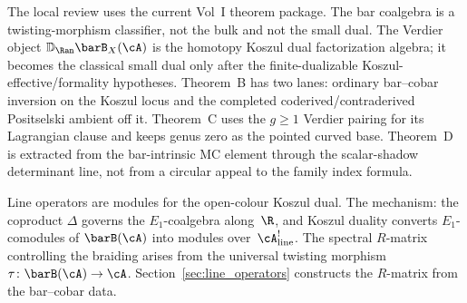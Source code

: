 \begin{remark}
\label{rem:vol1-theorem-package-rectification}
The local review uses the current Vol~I theorem package. The bar
coalgebra is a twisting-morphism classifier, not the bulk and not the
small dual. The Verdier object
$\mathbb D_{\Ran}\barB_X(\cA)$ is the homotopy Koszul dual
factorization algebra; it becomes the classical small dual only after
the finite-dualizable Koszul-effective/formality hypotheses. Theorem~B
has two lanes: ordinary bar--cobar inversion on the Koszul locus and
the completed coderived/contraderived Positselski ambient off it.
Theorem~C uses the $g\ge1$ Verdier pairing for its Lagrangian clause
and keeps genus zero as the pointed curved base. Theorem~D is extracted
from the bar-intrinsic MC element through the scalar-shadow
determinant line, not from a circular appeal to the family index
formula.
\end{remark}

\begin{remark}
\label{rem:transition-to-line-operators}
Line operators are modules for the open-colour Koszul dual. The mechanism:
the coproduct $\Delta$ governs the $E_1$-coalgebra along~$\R$,
and Koszul duality converts $E_1$-comodules of $\barB(\cA)$ into
modules over~$\cA^!_{\mathrm{line}}$. The spectral $R$-matrix controlling the
braiding arises from the universal twisting morphism
$\tau\colon \barB(\cA) \to \cA$.
Section~\ref{sec:line_operators} constructs the $R$-matrix from
the bar--cobar data.
\end{remark}

